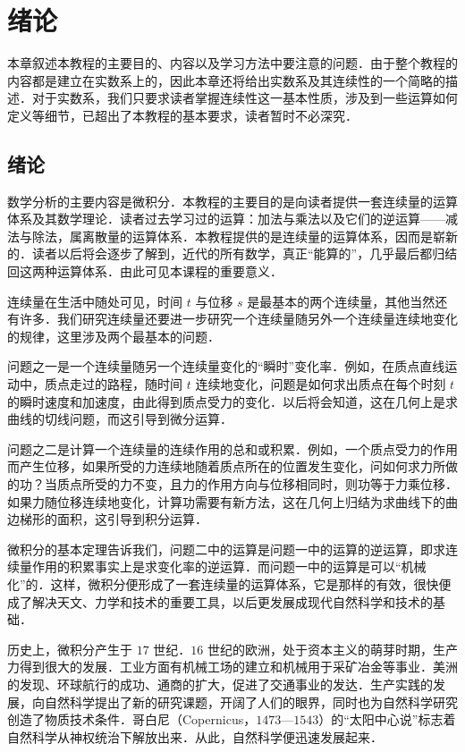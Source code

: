 \chapter{绪\hspace{1.5em}论}
\label{chap:01}

本章叙述本教程的主要目的、内容以及学习方法中要注意的问题．由于整个教程的内容都是建立在实数系上的，因此本章还将给出实数系及其连续性的一个简略的描述．对于实数系，我们只要求读者掌握连续性这一基本性质，涉及到一些运算如何定义等细节，已超出了本教程的基本要求，读者暂时不必深究．

\section{绪论}

数学分析的主要内容是微积分．本教程的主要目的是向读者提供一套连续量的运算体系及其数学理论．读者过去学习过的运算：加法与乘法以及它们的逆运算——减法与除法，属离散量的运算体系．本教程提供的是连续量的运算体系，因而是崭新的．读者以后将会逐步了解到，近代的所有数学，真正``能算的''，几乎最后都归结回这两种运算体系．由此可见本课程的重要意义．

连续量在生活中随处可见，时间 $t$ 与位移 $s$ 是最基本的两个连续量，其他当然还有许多．我们研究连续量还要进一步研究一个连续量随另外一个连续量连续地变化的规律，这里涉及两个最基本的问题．

问题之一是一个连续量随另一个连续量变化的``瞬时''变化率．例如，在质点直线运动中，质点走过的路程，随时间 $t$ 连续地变化，问题是如何求出质点在每个时刻 $t$ 的瞬时速度和加速度，由此得到质点受力的变化．以后将会知道，这在几何上是求曲线的切线问题，而这引导到微分运算．

问题之二是计算一个连续量的连续作用的总和或积累．例如，一个质点受力的作用而产生位移，如果所受的力连续地随着质点所在的位置发生变化，问如何求力所做的功？当质点所受的力不变，且力的作用方向与位移相同时，则功等于力乘位移．如果力随位移连续地变化，计算功需要有新方法，这在几何上归结为求曲线下的曲边梯形的面积，这引导到积分运算．

微积分的基本定理告诉我们，问题二中的运算是问题一中的运算的逆运算，即求连续量作用的积累事实上是求变化率的逆运算．而问题一中的运算是可以``机械化''的．这样，微积分便形成了一套连续量的运算体系，它是那样的有效，很快便成了解决天文、力学和技术的重要工具，以后更发展成现代自然科学和技术的基础．

历史上，微积分产生于 $17$ 世纪．$16$ 世纪的欧洲，处于资本主义的萌芽时期，生产力得到很大的发展．工业方面有机械工场的建立和机械用于采矿冶金等事业．美洲的发现、环球航行的成功、通商的扩大，促进了交通事业的发达．生产实践的发展，向自然科学提出了新的研究课题，开阔了人们的眼界，同时也为自然科学研究创造了物质技术条件．哥白尼（Copernicus，$1473$—$1543$）的``太阳中心说''标志着自然科学从神权统治下解放出来．从此，自然科学便迅速发展起来．


